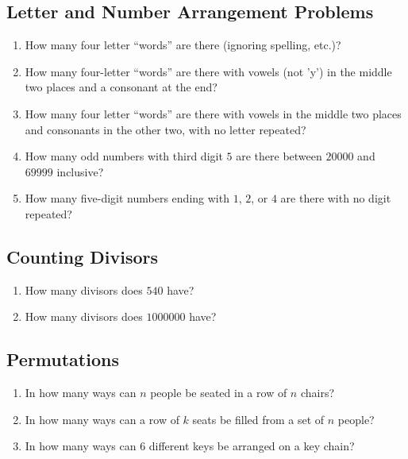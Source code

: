 \documentclass[twocolumn]{article}
\begin{document}
\subsection*{Letter and Number Arrangement Problems}
\begin{enumerate}
	\item How many four letter ``words'' are there (ignoring spelling, etc.)?
		\vspace{3cm}
	\item How many four-letter ``words'' are there with vowels (not 'y') in the 
		middle two places and a consonant at the end?
		\vspace{3cm}
	\item How many four letter ``words'' are there with vowels in the middle two 
		places and consonants in the other two, with no letter repeated?
		\vspace{3cm}
	\item How many odd numbers with third digit $5$ are there between $20000$ 
		and $69999$ inclusive?
		\vspace{3cm}
	\item How many five-digit numbers ending with $1$, $2$, or $4$ are there 
		with no digit repeated?
		\vspace{3cm}
\end{enumerate}

\subsection*{Counting Divisors}
\begin{enumerate}[resume]
	\item How many divisors does $540$ have?
		\vspace{3cm}
	\item How many divisors does $\num{1000000}$ have?
		\vspace{3cm}
\end{enumerate}

\subsection*{Permutations}
\begin{enumerate}[resume]
	\item In how many ways can $n$ people be seated in a row of $n$ chairs?
		\vspace{3cm}
	\item In how many ways can a row of $k$ seats be filled from a set of $n$ 
		people?
		\vspace{3cm}
	\item In how many ways can $6$ different keys be arranged on a key chain?
		\vspace{3cm}
\end{enumerate}
\end{document}

